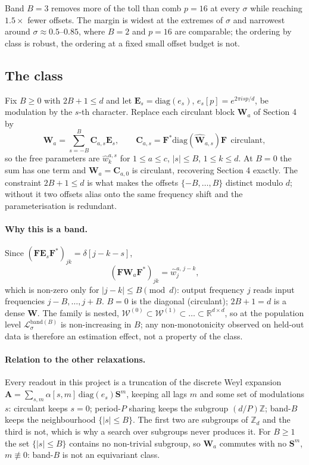 Band $B=3$ removes more of the toll than comb $p=16$ at every $\sigma$ while reaching
$1.5\times$ fewer offsets. The margin is widest at the extremes of $\sigma$ and narrowest
around $\sigma\approx0.5$--$0.85$, where $B=2$ and $p=16$ are comparable; the ordering by
class is robust, the ordering at a fixed small offset budget is not.

\subsection{The class}

Fix $B\ge0$ with $2B+1\le d$ and let $\boldsymbol{E}_{s}=\text{diag}(e_{s})$,
$e_{s}[p]=e^{2\pi isp/d}$, be modulation by the $s$-th character. Replace each
circulant block $\boldsymbol{W}_{a}$ of Section 4 by
\[
\boldsymbol{W}_{a}=\sum^{B}_{s=-B}\boldsymbol{C}_{a,s}\boldsymbol{E}_{s},
\qquad
\boldsymbol{C}_{a,s}=\boldsymbol{F}^{*}\text{diag}(\hat{\boldsymbol{W}}_{a,s})\boldsymbol{F}
\ \ \text{circulant},
\]
so the free parameters are $\hat{w}^{a,s}_{k}$ for $1\le a\le c$, $|s|\le B$,
$1\le k\le d$. At $B=0$ the sum has one term and $\boldsymbol{W}_{a}=\boldsymbol{C}_{a,0}$
is circulant, recovering Section 4 exactly. The constraint $2B+1\le d$ is what makes
the offsets $\{-B,\dots,B\}$ distinct modulo $d$; without it two offsets alias onto
the same frequency shift and the parameterisation is redundant.

\paragraph{Why this is a band.} Since
$(\boldsymbol{F}\boldsymbol{E}_{s}\boldsymbol{F}^{*})_{jk}=\delta[j-k-s]$,
\[
(\boldsymbol{F}\boldsymbol{W}_{a}\boldsymbol{F}^{*})_{jk}=\hat{w}^{a,\,j-k}_{j},
\]
which is non-zero only for $|j-k|\le B \pmod d$: output frequency $j$ reads input
frequencies $j-B,\dots,j+B$. $B=0$ is the diagonal (circulant); $2B+1=d$ is a dense
$\boldsymbol{W}$. The family is nested,
$\mathcal{W}^{(0)}\subset\mathcal{W}^{(1)}\subset\dots\subset\mathbb{R}^{d\times d}$,
so at the population level $\mathcal{L}^{\text{band}(B)}_{\sigma}$ is non-increasing
in $B$; any non-monotonicity observed on held-out data is therefore an estimation
effect, not a property of the class.

\paragraph{Relation to the other relaxations.} Every readout in this project is a
truncation of the discrete Weyl expansion
$\boldsymbol{A}=\sum_{s,m}\alpha[s,m]\,\text{diag}(e_{s})\boldsymbol{S}^{m}$, keeping
all lags $m$ and some set of modulations $s$: circulant keeps $s=0$; period-$P$
sharing keeps the subgroup $(d/P)\mathbb{Z}$; band-$B$ keeps the neighbourhood
$\{|s|\le B\}$. The first two are subgroups of $\mathbb{Z}_{d}$ and the third is not,
which is why a search over subgroups never produces it. For $B\ge1$ the set
$\{|s|\le B\}$ contains no non-trivial subgroup, so $\boldsymbol{W}_{a}$ commutes with
no $\boldsymbol{S}^{m}$, $m\not\equiv0$: band-$B$ is not an equivariant class.

